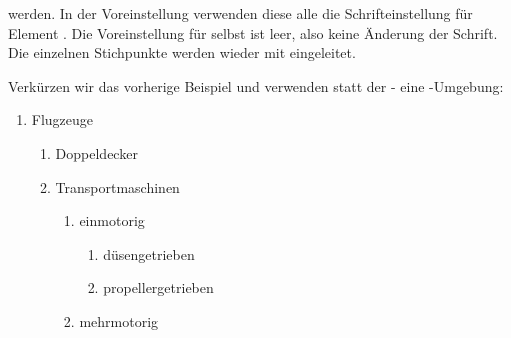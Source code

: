   werden. In der Voreinstellung verwenden diese alle die Schrifteinstellung
  für Element
  . Die
  Voreinstellung für  selbst ist leer, also keine
  Änderung der Schrift.%
   Die einzelnen Stichpunkte werden
  wieder mit  eingeleitet.%
    \begin{Example}
      Verkürzen wir das vorherige Beispiel und verwenden statt der
      - eine
      -Umgebung:
      \begin{ShowOutput}[\baselineskip]
        \begin{enumerate}
        \item Flugzeuge
          \begin{enumerate}
          \item Doppeldecker
          \item Transportmaschinen
            \begin{enumerate}
            \item einmotorig
              \begin{enumerate}
              \item{düsengetrieben}\label{xmp:maincls.jets}
              \item{propellergetrieben}
              \end{enumerate}
            \item mehrmotorig
            \end{enumerate}
          \end{enumerate}

\end{enumerate}
\end{ShowOutput}
\end{Example}
